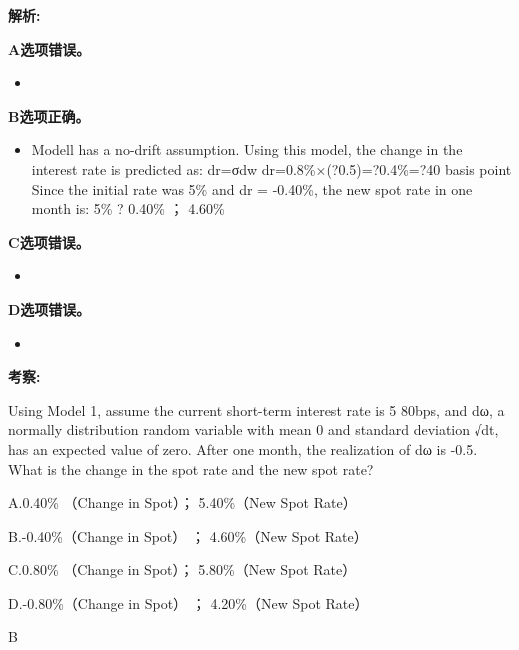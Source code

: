 \documentclass{article}
\newcounter{question} %
\newenvironment{explanation}
{\textbf{解析:}\par}
{\par}
\newcommand{\checklist}[1]{
    \textbf{考察:} #1 \par %
    \addcontentsline{toc}{subsection}{题号\thequestion 考察: #1} %
    \vspace{2em} %
}
\begin{document}
\begin{explanation}
    \textbf{A选项错误。}
    \begin{itemize}
        \item 
    \end{itemize}
    \textbf{B选项正确。}
    \begin{itemize}
        \item Modell has a no-drift assumption. Using this model, the change in the interest rate
        is predicted as: dr=σdw dr=0.8\%×(?0.5)=?0.4\%=?40 basis point Since the initial rate was 5\%
        and dr = -0.40\%, the new spot rate in one month is: 5\% ? 0.40\% ； 4.60\%
    \end{itemize}
    \textbf{C选项错误。}
    \begin{itemize}
        \item 
    \end{itemize}
    \textbf{D选项错误。}
    \begin{itemize}
        \item 
    \end{itemize}
\end{explanation}
\checklist{}







\begin{question}
    Using Model 1, assume the current short-term interest rate is 5%
    80bps, and dω, a normally distribution random variable with mean 0 and standard deviation
    √dt, has an expected value of zero. After one month, the realization of dω is -0.5. What is
    the change in the spot rate and the new spot rate?
\end{question}

\begin{choices}
    \item A.0.40\% （Change in Spot）； 5.40\%（New Spot Rate）
    \item B.-0.40\%（Change in Spot） ； 4.60\%（New Spot Rate）
    \item C.0.80\% （Change in Spot）； 5.80\%（New Spot Rate）
    \item D.-0.80\%（Change in Spot） ； 4.20\%（New Spot Rate）
\end{choices}

\begin{correctanswer}
    B
\end{correctanswer}
\end{document}
